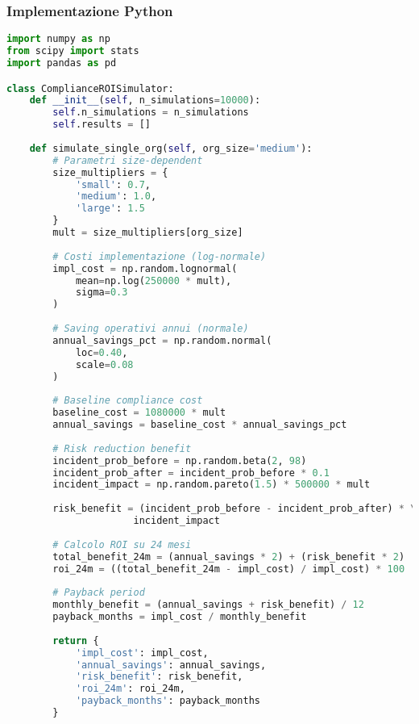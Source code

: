 \subsubsection{Implementazione Python}

\begin{lstlisting}[language=Python, caption=Simulazione Monte Carlo per ROI Compliance]
import numpy as np
from scipy import stats
import pandas as pd

class ComplianceROISimulator:
    def __init__(self, n_simulations=10000):
        self.n_simulations = n_simulations
        self.results = []
        
    def simulate_single_org(self, org_size='medium'):
        # Parametri size-dependent
        size_multipliers = {
            'small': 0.7,
            'medium': 1.0,
            'large': 1.5
        }
        mult = size_multipliers[org_size]
        
        # Costi implementazione (log-normale)
        impl_cost = np.random.lognormal(
            mean=np.log(250000 * mult),
            sigma=0.3
        )
        
        # Saving operativi annui (normale)
        annual_savings_pct = np.random.normal(
            loc=0.40,
            scale=0.08
        )
        
        # Baseline compliance cost
        baseline_cost = 1080000 * mult
        annual_savings = baseline_cost * annual_savings_pct
        
        # Risk reduction benefit
        incident_prob_before = np.random.beta(2, 98)
        incident_prob_after = incident_prob_before * 0.1
        incident_impact = np.random.pareto(1.5) * 500000 * mult
        
        risk_benefit = (incident_prob_before - incident_prob_after) * \
                      incident_impact
        
        # Calcolo ROI su 24 mesi
        total_benefit_24m = (annual_savings * 2) + (risk_benefit * 2)
        roi_24m = ((total_benefit_24m - impl_cost) / impl_cost) * 100
        
        # Payback period
        monthly_benefit = (annual_savings + risk_benefit) / 12
        payback_months = impl_cost / monthly_benefit
        
        return {
            'impl_cost': impl_cost,
            'annual_savings': annual_savings,
            'risk_benefit': risk_benefit,
            'roi_24m': roi_24m,
            'payback_months': payback_months
        }
    

\end{lstlisting}
